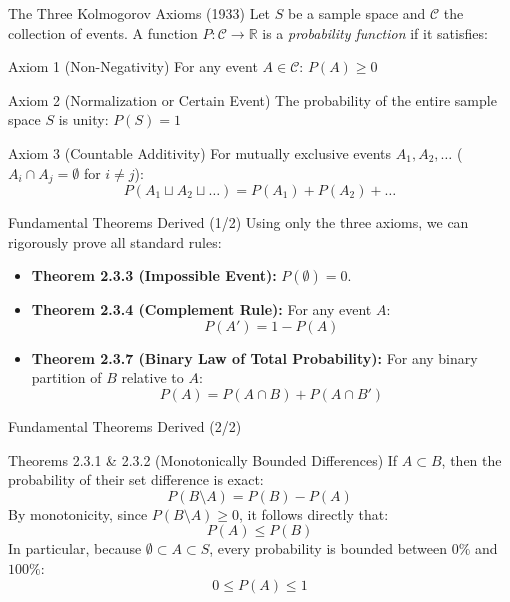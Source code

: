 \documentclass[10pt,aspectratio=169]{beamer}
\begin{document}
\begin{frame}{The Three Kolmogorov Axioms (1933)}
  \small Let $S$ be a sample space and $\mathcal{C}$ the collection of events. A function $P: \mathcal{C} \to \mathbb{R}$ is a \emph{probability function} if it satisfies: \pause

  \vspace{0.2em}
  \begin{block}{Axiom 1 (Non-Negativity)}
    For any event $A \in \mathcal{C}$: $P(A) \geq 0$
  \end{block}

  \vspace{0.1em}
  \pause
  \begin{block}{Axiom 2 (Normalization or Certain Event)}
    The probability of the entire sample space $S$ is unity: $P(S) = 1$
  \end{block}

  \vspace{0.1em}
  \pause
  \begin{block}{Axiom 3 (Countable Additivity)}
    For mutually exclusive events $A_1, A_2, \dots$ ($A_i \cap A_j = \emptyset$ for $i \neq j$):
    $$P(A_1 \sqcup A_2 \sqcup \dots) = P(A_1) + P(A_2) + \dots$$
  \end{block}
\end{frame}

\begin{frame}{Fundamental Theorems Derived (1/2)}
  Using only the three axioms, we can rigorously prove all standard rules: \pause

  \vspace{0.4em}
  \begin{itemize}
    \item \textbf{Theorem 2.3.3 (Impossible Event):} $P(\emptyset) = 0$. \pause
    \vspace{0.3em}
    \item \textbf{Theorem 2.3.4 (Complement Rule):} For any event $A$:
    $$P(A') = 1 - P(A)$$ \pause
    \vspace{0.3em}
    \item \textbf{Theorem 2.3.7 (Binary Law of Total Probability):} For any binary partition of $B$ relative to $A$:
    $$P(A) = P(A \cap B) + P(A \cap B')$$
  \end{itemize}
\end{frame}

\begin{frame}{Fundamental Theorems Derived (2/2)}
  \begin{block}{Theorems 2.3.1 \& 2.3.2 (Monotonically Bounded Differences)}
    If $A \subset B$, then the probability of their set difference is exact:
    $$P(B \setminus A) = P(B) - P(A)$$
    By monotonicity, since $P(B \setminus A) \geq 0$, it follows directly that:
    $$P(A) \leq P(B)$$
    In particular, because $\emptyset \subset A \subset S$, every probability is bounded between $0\%$ and $100\%$:
    $$0 \leq P(A) \leq 1$$
  \end{block}
\end{frame}
\end{document}
